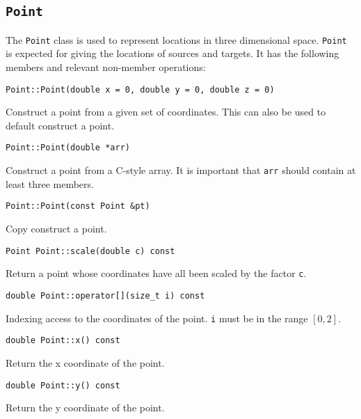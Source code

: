 \subsection{\texttt{Point}}
The \texttt{Point} class is used to represent locations in three dimensional
space. \texttt{Point} is expected for giving the locations of sources and
targets. It has the following members and relevant non-member operations:

\begin{lstlisting}
Point::Point(double x = 0, double y = 0, double z = 0)
\end{lstlisting}

\noindent Construct a point from a given set of coordinates. This can also be
used to default construct a point.

\begin{lstlisting}
Point::Point(double *arr)
\end{lstlisting}

\noindent  Construct a point from a C-style array. It is  important that
\texttt{arr} should contain at least three members.

\begin{lstlisting}
Point::Point(const Point &pt)
\end{lstlisting}

\noindent Copy construct a point.

\begin{lstlisting}
Point Point::scale(double c) const
\end{lstlisting}

\noindent Return a point whose coordinates have  all been scaled by the factor
\texttt{c}.

\begin{lstlisting}
double Point::operator[](size_t i) const
\end{lstlisting}

\noindent Indexing access to the coordinates of the point. \texttt{i} must be
in the range $[0,2]$.

\begin{lstlisting}
double Point::x() const
\end{lstlisting}

\noindent Return the x coordinate of the point.

\begin{lstlisting}
double Point::y() const
\end{lstlisting}

\noindent Return the y coordinate of the point.

